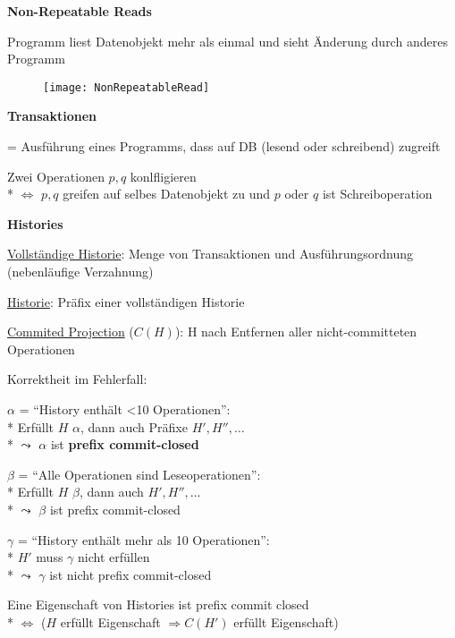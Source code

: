 \textbf{Non-Repeatable Reads}
\begin{items}
	\item Programm liest Datenobjekt mehr als einmal und sieht Änderung durch anderes Programm
\end{items}
\begin{figure}[H]\centering\label{NonRepeatableRead}\texttt{[image: NonRepeatableRead]}\end{figure}

\textbf{Transaktionen}
\begin{items}
	\item = Ausführung eines Programms, dass auf DB (lesend oder schreibend) zugreift
	\item Zwei Operationen \( p, q \) konlfligieren
		\\*
		\( \Leftrightarrow \) \( p,q \) greifen auf selbes Datenobjekt zu und \( p \) oder \( q \) ist Schreiboperation
\end{items}

\textbf{Histories}
\begin{items}
	\item \underline{Vollständige Historie}: Menge von Transaktionen und Ausführungsordnung (nebenläufige Verzahnung)
	\item \underline{Historie}: Präfix einer vollständigen Historie
	\item \underline{Commited Projection} (\( C(H) \)): H nach Entfernen aller nicht-committeten Operationen
	\item Korrektheit im Fehlerfall:
	\begin{enumeration}
		\item \( \alpha \) = ``History enthält <10 Operationen'': 
			\\*
			Erfüllt \( H \) \( \alpha \), dann auch Präfixe \( H', H'', \dots \)
			\\*
			\( \leadsto \) \( \alpha \) ist \textbf{prefix commit-closed}
		\item \( \beta \) = ``Alle Operationen sind Leseoperationen'':
			\\*
			Erfüllt \( H \) \( \beta \), dann auch \( H', H'', \dots \)
			\\*
			\( \leadsto \) \( \beta \) ist prefix commit-closed
		\item \( \gamma \) = ``History enthält mehr als 10 Operationen'':
			\\*
			\( H' \) muss \( \gamma \) nicht erfüllen \\*
			\( \leadsto \) \( \gamma \) ist nicht prefix commit-closed
	\end{enumeration}
	\item Eine Eigenschaft von Histories ist prefix commit closed
		\\*
		\( \Leftrightarrow \) (\( H \) erfüllt Eigenschaft \( \Rightarrow C(H') \) erfüllt Eigenschaft)
\end{items}

